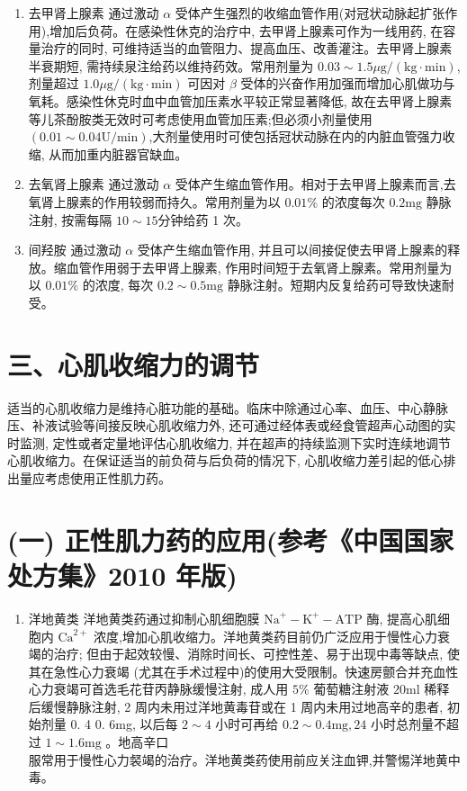 \documentclass[10pt]{article}
\begin{document}
\begin{enumerate}
  \item 去甲肾上腺素 通过激动 $\alpha$ 受体产生强烈的收缩血管作用(对冠状动脉起扩张作用),增加后负荷。在感染性休克的治疗中, 去甲肾上腺素可作为一线用药, 在容量治疗的同时, 可维持适当的血管阻力、提高血压、改善灌注。去甲肾上腺素半衰期短, 需持续泉注给药以维持药效。常用剂量为 $0.03 \sim 1.5 \mu \mathrm{g} /(\mathrm{kg} \cdot \mathrm{min})$, 剂量超过 $1.0 \mu \mathrm{g} /(\mathrm{kg} \cdot \mathrm{min})$ 可因对 $\beta$ 受体的兴奋作用加强而增加心肌做功与氧耗。感染性休克时血中血管加压素水平较正常显著降低, 故在去甲肾上腺素等儿茶酚胺类无效时可考虑使用血管加压素;但必须小剂量使用 $(0.01 \sim 0.04 \mathrm{U} / \mathrm{min})$,大剂量使用时可使包括冠状动脉在内的内脏血管强力收缩, 从而加重内脏器官缺血。

  \item 去氧肾上腺素 通过激动 $\alpha$ 受体产生缩血管作用。相对于去甲肾上腺素而言,去氧肾上腺素的作用较弱而持久。常用剂量为以 $0.01 \%$ 的浓度每次 $0.2 \mathrm{mg}$ 静脉注射, 按需每隔 $10 \sim 15$分钟给药 1 次。

  \item 间羟胺 通过激动 $\alpha$ 受体产生缩血管作用, 并且可以间接促使去甲肾上腺素的释放。缩血管作用弱于去甲肾上腺素, 作用时间短于去氧肾上腺素。常用剂量为以 $0.01 \%$ 的浓度, 每次 $0.2 \sim 0.5 \mathrm{mg}$ 静脉注射。短期内反复给药可导致快速耐受。

\end{enumerate}

\section*{三、心肌收缩力的调节}
适当的心肌收缩力是维持心脏功能的基础。临床中除通过心率、血压、中心静脉压、补液试验等间接反映心肌收缩力外, 还可通过经体表或经食管超声心动图的实时监测, 定性或者定量地评估心肌收缩力, 并在超声的持续监测下实时连续地调节心肌收缩力。在保证适当的前负荷与后负荷的情况下, 心肌收缩力差引起的低心排出量应考虑使用正性肌力药。

\section*{(一) 正性肌力药的应用(参考《中国国家处方集》2010 年版)}
\begin{enumerate}
  \item 洋地黄类 洋地黄类药通过抑制心肌细胞膜 $\mathrm{Na}^{+}-\mathrm{K}^{+}-\mathrm{ATP}$ 酶, 提高心肌细胞内 $\mathrm{Ca}^{2+}$ 浓度,增加心肌收缩力。洋地黄类药目前仍广泛应用于慢性心力衰竭的治疗; 但由于起效较慢、消除时间长、可控性差、易于出现中毒等缺点, 使其在急性心力衰竭 (尤其在手术过程中)的使用大受限制。快速房颤合并充血性心力衰竭可首选毛花苷丙静脉缓慢注射, 成人用 $5 \%$ 葡萄糖注射液 $20 \mathrm{ml}$ 稀释后缓慢静脉注射, 2 周内未用过洋地黄毒苷或在 1 周内未用过地高辛的患者, 初始剂量 0. 4 0. 6mg, 以后每 $2 \sim 4$ 小时可再给 $0.2 \sim 0.4 \mathrm{mg}, 24$ 小时总剂量不超过 $1 \sim 1.6 \mathrm{mg}$ 。地高辛口\\
服常用于慢性心力裻竭的治疗。洋地黄类药使用前应关注血钾,并警惕洋地黄中毒。
\end{enumerate}
\end{document}
